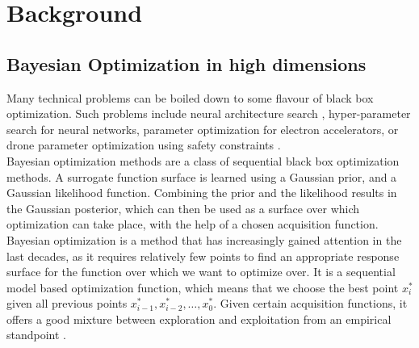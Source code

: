 
\chapter{Background}  %

\ifpdf
    \graphicspath{{Chapter1/Figs/Raster/}{Chapter1/Figs/PDF/}{Chapter1/Figs/}}
\else
    \graphicspath{{Chapter1/Figs/Vector/}{Chapter1/Figs/}}
\fi


\section{Bayesian Optimization in high dimensions} %

Many technical problems can be boiled down to some flavour of black box optimization. 
Such problems include neural architecture search \citep{BayesianOptimizationNAS}, hyper-parameter search for neural networks, parameter optimization for electron accelerators, or drone parameter optimization using safety constraints \citep{berkenkamp17saferl}. \\

Bayesian optimization methods are a class of sequential black box optimization methods.
A surrogate function surface is learned using a Gaussian prior, and a Gaussian likelihood function.
Combining the prior and the likelihood results in the Gaussian posterior, which can then be used as a surface over which optimization can take place, with the help of a chosen acquisition function. \\

Bayesian optimization is a method that has increasingly gained attention in the last decades, as it requires relatively few points to find an appropriate response surface for the function over which we want to optimize over.
It is a sequential model based optimization function, which means that we choose the best point $x^*_i$ given all previous points $x^*_{i-1}, x^*_{i-2}, \ldots, x^*_{0}$.
Given certain acquisition functions, it offers a good mixture between exploration and exploitation from an empirical standpoint \citep{BOIncreasingPopularityEmpirically}. \\

